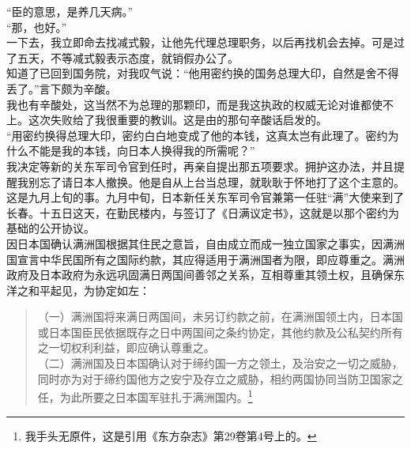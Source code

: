 “臣的意思，是养几天病。”\\

“那，也好。”\\

一下去，我立即命去找减式毅，让他先代理总理职务，以后再找机会去掉。可是过了五天，不等减式毅表示态度，就销假办公了。\\

知道了已回到国务院，对我叹气说：“他用密约换的国务总理大印，自然是舍不得丢了。”言下颇为辛酸。\\

我也有辛酸处，这当然不为总理的那颗印，而是我这执政的权威无论对谁都使不上。这次失败给了我很重要的教训。这是由的那句辛酸话启发的。\\

“用密约换得总理大印，密约白白地变成了他的本钱，这真太岂有此理了。密约为什么不能是我的本钱，向日本人换得我的所需呢？”\\

我决定等新的关东军司令官到任时，再亲自提出那五项要求。拥护这办法，并且提醒我别忘了请日本人撤换。他是自从上台当总理，就耿耿于怀地打了这个主意的。\\

这是九月上旬的事。九月中旬，日本新任关东军司令官兼第一任驻“满”大使来到了长春。十五日这天，在勤民楼内，与签订了《日满议定书》，这就是以那个密约为基础的公开协议。\\

因日本国确认满洲国根据其住民之意旨，自由成立而成一独立国家之事实，因满洲国宣言中华民国所有之国际约款，其应得适用于满洲国者为限，即应尊重之。满洲政府及日本政府为永远巩固满日两国间善邻之关系，互相尊重其领土权，且确保东洋之和平起见，为协定如左：\\

\begin{quote}
	（一）满洲国将来满日两国间，未另订约款之前，在满洲国领土内，日本国或日本国臣民依据既存之日中两国间之条约协定，其他约款及公私契约所有之一切权利利益，即应确认尊重之。\\

（二）满洲国及日本国确认对于缔约国一方之领土，及治安之一切之威胁，同时亦为对于缔约国他方之安宁及存立之威胁，相约两国协同当防卫国家之任，为此所要之日本国军驻扎于满洲国内。\footnote{我手头无原件，这是引用《东方杂志》第29卷第4号上的。}\\
\end{quote}

